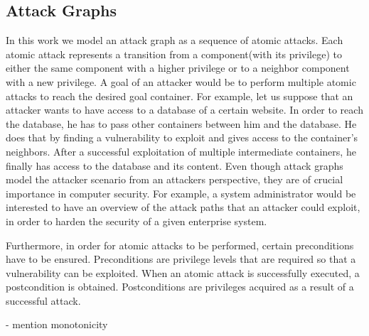 \subsection{Attack Graphs}
\label{chap:attack_graphs}
In this work we model an attack graph as a sequence of atomic attacks. Each atomic attack represents a transition from a component(with its privilege) to either the same component with a higher privilege or to a neighbor component with a new privilege. A goal of an attacker would be to perform multiple atomic attacks to reach the desired goal container. For example, let us suppose that an attacker wants to have access to a database of a certain website. In order to reach the database, he has to pass other containers between him and the database. He does that by finding a vulnerability to exploit and gives access to the container's neighbors. After a successful exploitation of multiple intermediate containers, he finally has access to the database and its content. Even though attack graphs model the attacker scenario from an attackers perspective, they are of crucial importance in computer security. For example, a system administrator would be interested to have an overview of the attack paths that an attacker could exploit, in order to harden the security of a given enterprise system.

Furthermore, in order for atomic attacks to be performed, certain preconditions have to be ensured. Preconditions are privilege levels that are required so that a vulnerability can be exploited. When an atomic attack is successfully executed, a postcondition is obtained. Postconditions are privileges acquired as a result of a successful attack. 

- mention monotonicity
